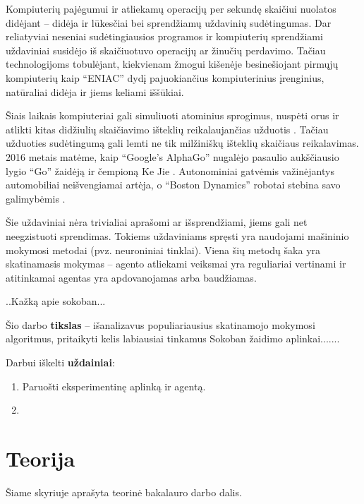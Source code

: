 \documentclass{VUMIFPSbakalaurinis}
\begin{document}
\label{sec:ivadas}
\label{subsec:problematika}
{
	Kompiuterių pajėgumui ir atliekamų operacijų per sekundę skaičiui nuolatos didėjant -- didėja ir lūkesčiai bei sprendžiamų uždavinių sudėtingumas. Dar reliatyviai neseniai sudėtingiausios programos ir kompiuterių sprendžiami uždaviniai susidėjo iš skaičiuotuvo operacijų ar žinučių perdavimo. Tačiau technologijoms tobulėjant, kiekvienam žmogui kišenėje besinešiojant pirmųjų kompiuterių kaip \enquote{ENIAC} \cite{computer_history} dydį pajuokiančius kompiuterinius įrenginius, natūraliai didėja ir jiems keliami iššūkiai.\par
	
	Šiais laikais kompiuteriai gali simuliuoti atominius sprogimus, nuspėti orus ir atlikti kitas didžiulių skaičiavimo išteklių reikalaujančias užduotis \cite{supercomputers}. Tačiau užduoties sudėtingumą gali lemti ne tik milžiniškų išteklių skaičiaus reikalavimas. 2016 metais matėme, kaip \enquote{Google’s AlphaGo} nugalėjo pasaulio aukščiausio lygio \enquote{Go} žaidėją ir čempioną Ke Jie \cite{go}. Autonominiai gatvėmis važinėjantys automobiliai neišvengiamai artėja, o \enquote{Boston Dynamics} robotai stebina savo galimybėmis \cite{bostondynamics}.\par
	
	Šie uždaviniai nėra trivialiai aprašomi ar išsprendžiami, jiems gali net neegzistuoti sprendimas. Tokiems uždaviniams spręsti yra naudojami mašininio mokymosi metodai (pvz. neuroniniai tinklai). Viena šių metodų šaka yra skatinamasis mokymas -- agento atliekami veiksmai yra reguliariai vertinami ir atitinkamai agentas yra apdovanojamas arba baudžiamas.
	
	..Kažką apie sokoban...
}
\label{subsec:tikslas}
{
	Šio darbo \textbf{tikslas} -- išanalizavus populiariausius skatinamojo mokymosi algoritmus, pritaikyti kelis labiausiai tinkamus Sokoban žaidimo aplinkai.......
}
\label{subsec:uzdaviniai}
{
	Darbui iškelti \textbf{uždainiai}:
	\begin{enumerate}
		\item Paruošti eksperimentinę aplinką ir agentą.
		\item
	\end{enumerate}
}
\section{Teorija}\label{sec:1}
Šiame skyriuje aprašyta teorinė bakalauro darbo dalis.
\end{document}

